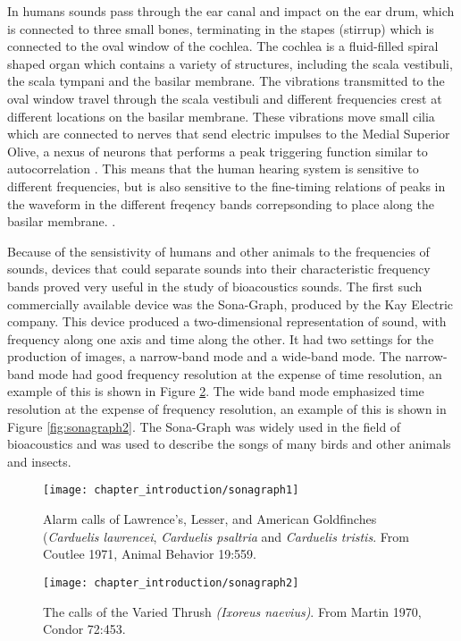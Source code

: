 In humans sounds pass through the ear canal and impact on the ear
drum, which is connected to three small bones, terminating in the
stapes (stirrup) which is connected to the oval window of the cochlea.
The cochlea is a fluid-filled spiral shaped organ which contains a
variety of structures, including the scala vestibuli, the scala
tympani and the basilar membrane.  The vibrations transmitted to the
oval window travel through the scala vestibuli and different
frequencies crest at different locations on the basilar membrane.
These vibrations move small cilia which are connected to nerves that
send electric impulses to the Medial Superior Olive, a nexus of
neurons that performs a peak triggering function similar to
autocorrelation \cite{lyon10}.  This means that the human hearing
system is sensitive to different frequencies, but is also sensitive to
the fine-timing relations of peaks in the waveform in the different
freqency bands correpsonding to place along the basilar membrane.
\cite{waltersphd}.

Because of the sensistivity of humans and other animals to the
frequencies of sounds, devices that could separate sounds into their
characteristic frequency bands proved very useful in the study of
bioacoustics sounds.  The first such commercially available device was
the Sona-Graph, produced by the Kay Electric company.  This device
produced a two-dimensional representation of sound, with frequency
along one axis and time along the other.  It had two settings for the
production of images, a narrow-band mode and a wide-band mode.  The
narrow-band mode had good frequency resolution at the expense of time
resolution, an example of this is shown in Figure
\ref{fig:sonagraph1}.  The wide band mode emphasized time resolution
at the expense of frequency resolution, an example of this is shown in
Figure \ref{fig:sonagraph2}.  The Sona-Graph was widely used in the
field of bioacoustics and was used to describe the songs of many birds
and other animals and insects.

\begin{figure}[t]
\centering
\texttt{[image: chapter\_introduction/sonagraph1]}
\caption{Alarm calls of Lawrence's, Lesser, and American Goldfinches
  (\textit{Carduelis lawrencei}, \textit{Carduelis psaltria} and
  \textit{Carduelis tristis}. From Coutlee 1971, Animal Behavior
  19:559.}
\label{fig:sonagraph1}
\end{figure}

\begin{figure}[t]
\centering
\texttt{[image: chapter\_introduction/sonagraph2]}
\caption{The calls of the Varied Thrush \textit{(Ixoreus
    naevius)}. From Martin 1970, Condor 72:453.}
\label{fig:sonagraph1}
\end{figure}

